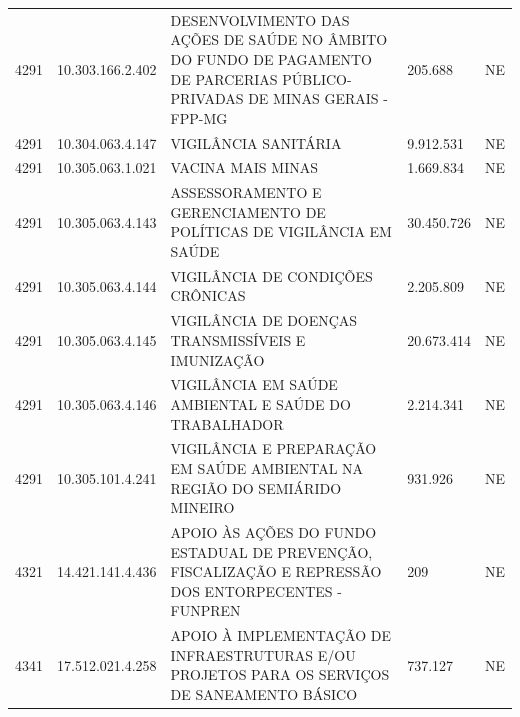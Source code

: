 \documentclass{article}
\begin{document}
\begin{longtable}[c]{m{1cm}|m{2cm}|m{10cm}|m{2cm}|m{1cm}}
\multicolumn{1}{C{1cm}|}{4291} & \multicolumn{1}{C{2cm}|}{10.303.166.2.402} & \multicolumn{1}{L{10cm}|}{DESENVOLVIMENTO DAS AÇÕES DE SAÚDE NO ÂMBITO DO FUNDO DE PAGAMENTO DE PARCERIAS PÚBLICO-PRIVADAS DE MINAS GERAIS - FPP-MG} & \multicolumn{1}{R{2cm}|}{205.688} & \multicolumn{1}{C{1cm}}{NE} \\
\multicolumn{1}{C{1cm}|}{4291} & \multicolumn{1}{C{2cm}|}{10.304.063.4.147} & \multicolumn{1}{L{10cm}|}{VIGILÂNCIA SANITÁRIA} & \multicolumn{1}{R{2cm}|}{9.912.531} & \multicolumn{1}{C{1cm}}{NE} \\
\multicolumn{1}{C{1cm}|}{4291} & \multicolumn{1}{C{2cm}|}{10.305.063.1.021} & \multicolumn{1}{L{10cm}|}{VACINA MAIS MINAS} & \multicolumn{1}{R{2cm}|}{1.669.834} & \multicolumn{1}{C{1cm}}{NE} \\
\multicolumn{1}{C{1cm}|}{4291} & \multicolumn{1}{C{2cm}|}{10.305.063.4.143} & \multicolumn{1}{L{10cm}|}{ASSESSORAMENTO E GERENCIAMENTO DE POLÍTICAS DE VIGILÂNCIA EM SAÚDE} & \multicolumn{1}{R{2cm}|}{30.450.726} & \multicolumn{1}{C{1cm}}{NE} \\
\multicolumn{1}{C{1cm}|}{4291} & \multicolumn{1}{C{2cm}|}{10.305.063.4.144} & \multicolumn{1}{L{10cm}|}{VIGILÂNCIA DE CONDIÇÕES CRÔNICAS} & \multicolumn{1}{R{2cm}|}{2.205.809} & \multicolumn{1}{C{1cm}}{NE} \\
\multicolumn{1}{C{1cm}|}{4291} & \multicolumn{1}{C{2cm}|}{10.305.063.4.145} & \multicolumn{1}{L{10cm}|}{VIGILÂNCIA DE DOENÇAS TRANSMISSÍVEIS E IMUNIZAÇÃO} & \multicolumn{1}{R{2cm}|}{20.673.414} & \multicolumn{1}{C{1cm}}{NE} \\
\multicolumn{1}{C{1cm}|}{4291} & \multicolumn{1}{C{2cm}|}{10.305.063.4.146} & \multicolumn{1}{L{10cm}|}{VIGILÂNCIA EM SAÚDE AMBIENTAL E SAÚDE DO TRABALHADOR} & \multicolumn{1}{R{2cm}|}{2.214.341} & \multicolumn{1}{C{1cm}}{NE} \\
\multicolumn{1}{C{1cm}|}{4291} & \multicolumn{1}{C{2cm}|}{10.305.101.4.241} & \multicolumn{1}{L{10cm}|}{VIGILÂNCIA E PREPARAÇÃO EM SAÚDE AMBIENTAL NA REGIÃO DO SEMIÁRIDO MINEIRO} & \multicolumn{1}{R{2cm}|}{931.926} & \multicolumn{1}{C{1cm}}{NE} \\
\multicolumn{1}{C{1cm}|}{4321} & \multicolumn{1}{C{2cm}|}{14.421.141.4.436} & \multicolumn{1}{L{10cm}|}{APOIO ÀS AÇÕES DO FUNDO ESTADUAL DE PREVENÇÃO, FISCALIZAÇÃO E REPRESSÃO DOS ENTORPECENTES - FUNPREN} & \multicolumn{1}{R{2cm}|}{209} & \multicolumn{1}{C{1cm}}{NE} \\
\multicolumn{1}{C{1cm}|}{4341} & \multicolumn{1}{C{2cm}|}{17.512.021.4.258} & \multicolumn{1}{L{10cm}|}{APOIO À IMPLEMENTAÇÃO DE INFRAESTRUTURAS E/OU PROJETOS PARA OS SERVIÇOS DE SANEAMENTO BÁSICO} & \multicolumn{1}{R{2cm}|}{737.127} & \multicolumn{1}{C{1cm}}{NE} \\

\end{longtable}
\end{document}
